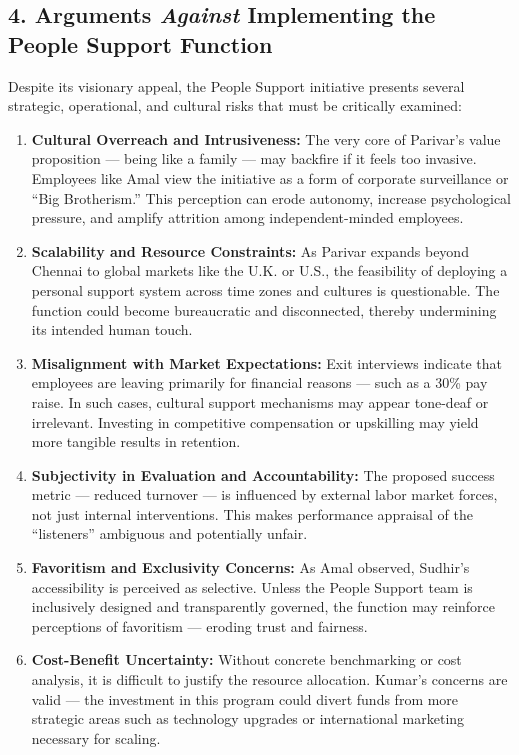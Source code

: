 \documentclass[10pt,a4paper]{book}
\begin{document}
\subsection*{4. Arguments \textit{Against} Implementing the People Support Function}

Despite its visionary appeal, the People Support initiative presents several strategic, operational, and cultural risks that must be critically examined:

\begin{enumerate}
    \item \textbf{Cultural Overreach and Intrusiveness:} The very core of Parivar’s value proposition — being like a family — may backfire if it feels too invasive. Employees like Amal view the initiative as a form of corporate surveillance or “Big Brotherism.” This perception can erode autonomy, increase psychological pressure, and amplify attrition among independent-minded employees.

    \item \textbf{Scalability and Resource Constraints:} As Parivar expands beyond Chennai to global markets like the U.K. or U.S., the feasibility of deploying a personal support system across time zones and cultures is questionable. The function could become bureaucratic and disconnected, thereby undermining its intended human touch.

    \item \textbf{Misalignment with Market Expectations:} Exit interviews indicate that employees are leaving primarily for financial reasons — such as a 30\% pay raise. In such cases, cultural support mechanisms may appear tone-deaf or irrelevant. Investing in competitive compensation or upskilling may yield more tangible results in retention.

    \item \textbf{Subjectivity in Evaluation and Accountability:} The proposed success metric — reduced turnover — is influenced by external labor market forces, not just internal interventions. This makes performance appraisal of the “listeners” ambiguous and potentially unfair.

    \item \textbf{Favoritism and Exclusivity Concerns:} As Amal observed, Sudhir’s accessibility is perceived as selective. Unless the People Support team is inclusively designed and transparently governed, the function may reinforce perceptions of favoritism — eroding trust and fairness.

    \item \textbf{Cost-Benefit Uncertainty:} Without concrete benchmarking or cost analysis, it is difficult to justify the resource allocation. Kumar’s concerns are valid — the investment in this program could divert funds from more strategic areas such as technology upgrades or international marketing necessary for scaling.


\end{enumerate}
\end{document}
